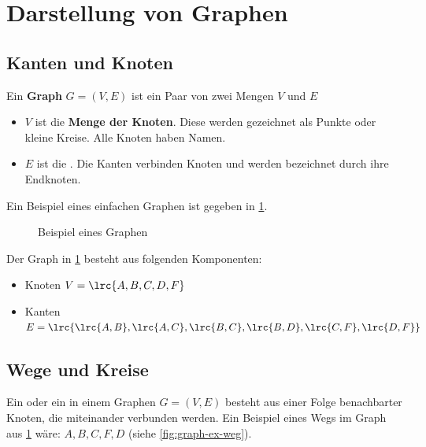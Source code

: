 \section{Darstellung von Graphen}
\subsection{Kanten und Knoten}
Ein \textbf{Graph} $G=(V,E)$ ist ein Paar von zwei Mengen $V$ und $E$
\begin{itemize}
    \item $V$ ist die \textbf{Menge der Knoten}. Diese werden gezeichnet als Punkte oder kleine Kreise. Alle Knoten haben Namen.
    \item $E$ ist die . Die Kanten verbinden Knoten und werden bezeichnet durch ihre Endknoten.
\end{itemize}

Ein Beispiel eines einfachen Graphen ist gegeben in \cref{fig:graph-ex}.
\begin{figure}[H]
    \centering
    \caption{Beispiel eines Graphen}
    \label{fig:graph-ex}
\end{figure}
Der Graph in \cref{fig:graph-ex} besteht aus folgenden Komponenten:
\begin{itemize}
    \item Knoten $V=\lrc{A,B,C,D,F}$
    \item Kanten $E=\lrc{\lrc{A,B},\lrc{A,C},\lrc{B,C},\lrc{B,D},\lrc{C,F},\lrc{D,F}}$
\end{itemize}
\subsection{Wege und Kreise}
Ein  oder ein  in einem Graphen $G=(V,E)$ besteht aus einer Folge benachbarter Knoten, die miteinander verbunden werden. Ein Beispiel eines Wegs im Graph aus \cref{fig:graph-ex} wäre: $A,B,C,F,D$ (siehe \cref{fig:graph-ex-weg}). 

